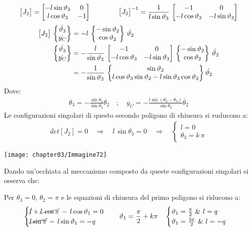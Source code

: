 \begin{enumerate}
			 \begin{gather*}
			 \M{J_2}=\M{-l\sin{\theta_3}&0\\ l\cos{\theta_3}&-1}\qquad\qquad \M{J_2}^{-1}=\frac{1}{l\sin{\theta_3}}\,\M{-1&0\\-l\cos{\theta_3}&-l\sin{\theta_3}}
			 \end{gather*}
			 \begin{align*}
			 \M{J_2}\,\B{\dot{\theta_3}\\\dot{y_C}}&= - l\,\B{-\sin{\theta_2}\\\cos{\theta_2}}\,\dot{\theta_2}\\
			 \B{\dot{\theta_3}\\\dot{y_C}}&= - \frac{l}{\sin{\theta_3}}\,\M{-1&0\\-l\cos{\theta_3}&-l\sin{\theta_3}}\,\B{-\sin{\theta_2}\\\cos{\theta_2}}\,\dot{\theta_2}\\
			 &= - \frac{1}{\sin{\theta_3}}\,\B{\sin{\theta_2}\\l\cos{\theta_3}\sin{\theta_2}-l\sin{\theta_3}\cos{\theta_2}}\dot{\theta_2}\\
			 \end{align*}
			 Dove:
			 \begin{gather*}
			 \dot{\theta_3}= - \frac{\sin{\theta_2}}{\sin{\theta_3}}\dot{\theta_2}\quad;\quad\dot{y_C}=-\frac{l \sin{(\theta_2-\theta_3)}}{\sin{\theta_3}}\dot{\theta_2}
			 \end{gather*}
			 Le configurazioni singolari di questo secondo poligono di chiusura si ruducono a:
			 \begin{gather*}
			 det[J_2] = 0 \quad\Rightarrow\quad l\,\sin{\theta_3} = 0\quad\Rightarrow\quad \begin{cases}l = 0\\\theta_3 = k\,\pi\end{cases}
			 \end{gather*}

			 \begin{center}
			 \texttt{[image: chapter03/Immagine72]}
			 \end{center}

			 Dando un'occhiata al meccanismo composto da queste configurazioni singolari si osserva che:
			 
			 Per $\theta_3 = 0$, $\theta_2 = \pi$ e le equazioni di chiusura del primo poligono si riducono a:
			 \begin{gather*}
			 \begin{cases}
			 \cancel{l} +\cancel{ l\,\cos{\pi}}\,-\,l\cos{\theta_1} = 0\\
			\cancel{ l\sin{\pi}}\,-\,l\sin{\theta_1} = -q
			 \end{cases}
			 \quad
			 \theta_1 = \frac{\pi}{2} + k \pi
			 \quad
			 \begin{cases}
			 \theta_1 = \frac{\pi}{2} \,\,\text{\&}\,\, l = q\\
			 \theta_1 =  \frac{3 \pi}{2}\,\, \text{\&} \,\,l = -q
			 \end{cases}
			 \end{gather*}
			 

\end{enumerate}
